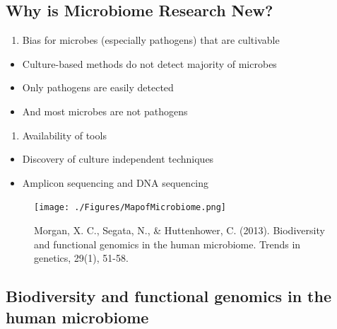 \documentclass[
]{book}
\providecommand{\tightlist}{%
  \setlength{\itemsep}{0pt}\setlength{\parskip}{0pt}}
\begin{document}
\hypertarget{why-is-microbiome-research-new}{%
\subsection{Why is Microbiome Research New?}\label{why-is-microbiome-research-new}}

\begin{enumerate}
\def\labelenumi{\arabic{enumi}.}
\tightlist
\item
  Bias for microbes (especially pathogens) that are
  cultivable
\end{enumerate}

\begin{itemize}
\tightlist
\item
  Culture-based methods do not detect majority of microbes
\item
  Only pathogens are easily detected
\item
  And most microbes are not pathogens
\end{itemize}

\begin{enumerate}
\def\labelenumi{\arabic{enumi}.}
\setcounter{enumi}{1}
\tightlist
\item
  Availability of tools
\end{enumerate}

\begin{itemize}
\tightlist
\item
  Discovery of culture independent techniques
\item
  Amplicon sequencing and DNA sequencing
\end{itemize}

\begin{figure}
\centering
\texttt{[image: ./Figures/MapofMicrobiome.png]}
\caption{Morgan, X. C., Segata, N., \& Huttenhower, C. (2013). Biodiversity and functional genomics in the human microbiome. Trends in genetics, 29(1), 51-58.}
\end{figure}

\hypertarget{biodiversity-and-functional-genomics-in-the-human-microbiome}{%
\subsection{Biodiversity and functional genomics in the human microbiome}\label{biodiversity-and-functional-genomics-in-the-human-microbiome}}
\end{document}

